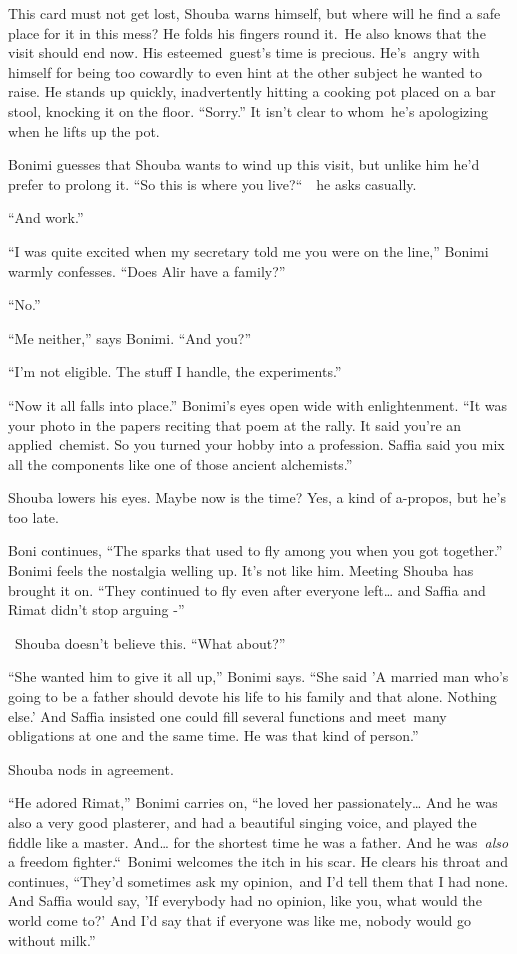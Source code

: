 \documentclass[twoside,11pt]{book}
\begin{document}
This card must not get lost, Shouba warns himself, but where will he find a safe place for it in this mess? He folds his
fingers round it.\ He also knows that the visit should end now. His esteemed~guest's time is precious.
He's{\ }angry with himself for being too cowardly to even hint at the other
subject he wanted to raise. He stands up quickly, inadvertently hitting a cooking pot placed on a bar stool, knocking
it on the floor. ``Sorry.'' It isn't clear to whom\ he's apologizing when he lifts up the
pot.

Bonimi guesses that Shouba wants to wind up this visit, but unlike him he'd prefer to prolong it. ``So this
is where you live?``\ \ he asks casually. 

``And work.''

``I was quite excited when my secretary told me you were on the line,'' Bonimi warmly
confesses. ``Does Alir have a family?''

``No.''

``Me neither,'' says Bonimi. ``And you?'' 

``I'm not eligible. The stuff I handle, the experiments.''

``Now it all falls into place.'' Bonimi's eyes open wide with enlightenment. ``It
was your photo in the papers reciting that poem at the rally. It said you're an applied\ chemist. So you turned your
hobby into a profession. Saffia said you mix all the components like one of those ancient alchemists.''

Shouba lowers his eyes. Maybe now is the time? Yes, a kind of a-propos, but he's too late. 

Boni continues, ``The sparks that used to fly among you when you got together.'' Bonimi feels
the nostalgia welling up. It's not like him. Meeting Shouba has brought it on. ``They continued to fly
even after everyone left{\dots}  and Saffia and Rimat didn't stop arguing -''

~Shouba doesn't believe this. ``What about?''

``She wanted {him} to give it all up,'' Bonimi says. ``She said
'A married man who's going to be a father should devote his life to his family and that alone. Nothing else.{}' And
Saffia insisted one could fill several functions and meet\ many obligations at one and the same time. He was that kind
of person.'' 

Shouba nods in agreement. 

``He adored Rimat,'' Bonimi carries on, ``he loved her passionately{\dots} And he
was also a very good plasterer, and had a beautiful singing voice, and played the fiddle like a master. And{\dots} for
the shortest time he was a father. And he was\ \textit{also} a freedom fighter.``\ Bonimi welcomes the
itch in his scar. He clears his throat and continues, ``They'd sometimes ask my opinion,\ and I'd tell
them that I had none. And Saffia would say, 'If everybody had no opinion, like you, what would the world come to?' And
I'd say that if everyone was like me, nobody would go without milk.''
\end{document}
